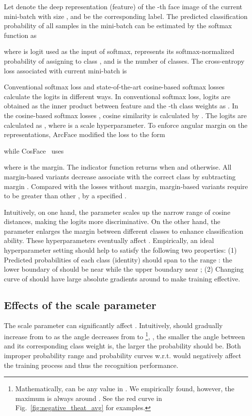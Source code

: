 \documentclass[10pt,twocolumn,letterpaper]{article}
\begin{document}
Let  denote the deep representation (feature) of the -th face image of the current mini-batch with size , and  be the corresponding label. The predicted classification probability  of all  samples in the mini-batch can be estimated by the softmax function as

where  is logit used as the input of softmax,  represents its softmax-normalized probability of assigning  to class , and  is the number of classes. The cross-entropy loss associated with current mini-batch is


Conventional softmax loss and state-of-the-art cosine-based softmax losses~\cite{L2-softmax,CosFace,ArcFace} calculate the logits  in different ways. In conventional softmax loss, logits  are obtained as the inner product between feature  and the -th class weights  as .
In the cosine-based softmax losses \cite{L2-softmax,CosFace,ArcFace}, cosine similarity is calculated by . The logits  are calculated as , where  is a scale hyperparameter. To enforce angular margin on the representations, ArcFace \cite{ArcFace} modified the loss to the form

while CosFace~\cite{CosFace} uses 

where  is the margin. The indicator function  returns  when  and  otherwise. All margin-based variants decrease  associate with the correct class by subtracting  margin . Compared with the losses without margin, margin-based variants require  to be greater than other , by a specified . 

Intuitively, on one hand, the parameter  scales up the narrow range of cosine distances, making the logits more discriminative. On the other hand, the parameter  enlarges the margin between different classes to enhance classification ability. These hyperparameters eventually affect . Empirically, an ideal hyperparameter setting should help  to satisfy the following two properties: 
(1) Predicted probabilities  of each class (identity) should span to the range : the lower boundary of  should be near  while the upper boundary near ; 
(2) Changing curve of  should have large absolute gradients around  to make training effective. 




\subsection{Effects of the scale parameter }
\label{ssec:effect_s}

The scale parameter  can significantly affect . Intuitively,  should gradually increase from  to  as the angle  decreases from  to \footnote{Mathematically,  can be any value in . We empirically found, however, the maximum  is always around . See the red curve in Fig.~\ref{fig:negative_theat_avg} for examples.}, \ie, the smaller the angle between  and its corresponding class weight  is, the larger the probability should be. Both improper probability range and probability curves w.r.t.  would negatively affect the training process and thus the recognition performance.
\end{document}
